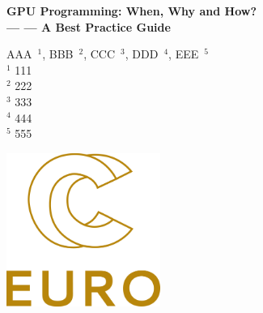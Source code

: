 \documentclass[article, a4paper, 11pt, amsmath, amssymb]{revtex4-1}
\begin{document}
\setpagewiselinenumbers
\modulolinenumbers[5]



\begin{titlepage}
    \begin{center}
        \vspace*{1cm}

        \Huge
        \textbf{\LARGE{GPU Programming: When, Why and How?}}\\
        \vspace{0.0cm}
        \textbf{\Large{--- --- A Best Practice Guide}}

        \vspace{0.3cm}

        \textrm{\large{AAA~$^{1}$, BBB~$^{2}$, CCC~$^{3}$, DDD~$^{4}$, EEE~$^{5}$}}\\
        \vspace{1.0cm}
        $^1$ 111\\
        $^2$ 222\\
        $^3$ 333\\
        $^4$ 444\\
        $^5$ 555

        \vspace{2.0cm}

        \includegraphics[height=5cm]{fig_logo_history/eurocc.png}

    \end{center}
\end{titlepage}
\end{document}

